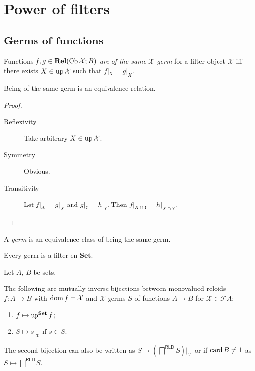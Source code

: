 \chapter{Power of filters}

\section{Germs of functions}

\begin{defn}
  Functions $f, g \in \mathbf{Rel} (\operatorname{Ob} \mathcal{X} ; B)$
  \emph{are of the same $\mathcal{X}$-germ} for a filter object
  $\mathcal{X}$ iff there exists $X \in \operatorname{up} \mathcal{X}$ such that $f|_X
  = g|_X$.
\end{defn}

\begin{prop}
  Being of the same germ is an equivalence relation.
\end{prop}

\begin{proof}
  ~
  \begin{description}
    \item[Reflexivity] Take arbitrary $X \in \operatorname{up} \mathcal{X}$.
    
    \item[Symmetry] Obvious.
    
    \item[Transitivity] Let $f|_X = g|_X$ and $g|_Y = h|_Y$. Then $f|_{X \cap
    Y} = h|_{X \cap Y}$.
  \end{description}
\end{proof}

\begin{defn}
  A \emph{germ} is an equivalence class of being the same germ.
\end{defn}

\begin{obvious}
Every germ is a filter on $\mathbf{Set}$.
\end{obvious}

\begin{thm}
  Let $A$, $B$ be sets.

  The following are mutually inverse bijections between monovalued reloids $f
  : A \rightarrow B$ with $\operatorname{dom} f = \mathcal{X}$ and $\mathcal{X}$-germs
  $S$ of functions $A \rightarrow B$ for $\mathcal{X} \in \mathscr{F} A$:
  \begin{enumerate}
    \item $f \mapsto \operatorname{up}^{\mathbf{Set}} f$;
    \item $S \mapsto s|_{\mathcal{X}}$ if $s\in S$.
  \end{enumerate}
  The second bijection can also be written as $S \mapsto \left(\bigsqcap^{\mathsf{RLD}} S\right)|_{\mathcal{X}}$ or
  if $\operatorname{card} B\ne 1$ as $S \mapsto \bigsqcap^{\mathsf{RLD}} S$.
\end{thm}

